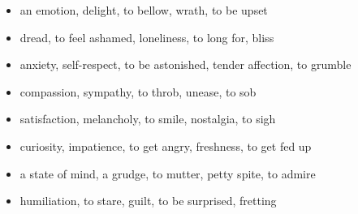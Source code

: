 \begin{itemize}
\raggedright
  \item an emotion, delight, to bellow, wrath, to be upset
  \item dread, to feel ashamed, loneliness, to long for, bliss
  \item anxiety, self-respect, to be astonished, tender affection, to grumble
  \item compassion, sympathy, to throb, unease, to sob
  \item satisfaction, melancholy, to smile, nostalgia, to sigh
  \item curiosity, impatience, to get angry, freshness, to get fed up
  \item a state of mind, a grudge, to mutter, petty spite, to admire
  \item humiliation, to stare, guilt, to be surprised, fretting
\end{itemize}

